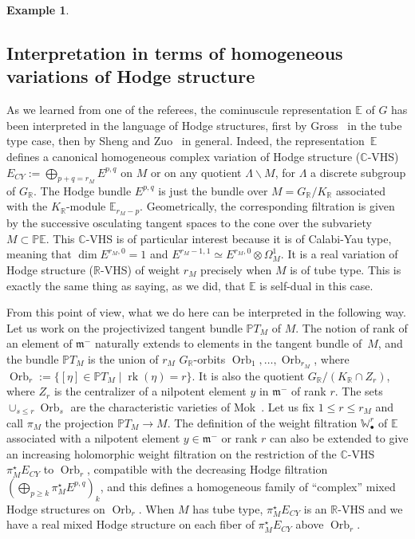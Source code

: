 \documentclass[10pt]{amsart}
\newcommand{\sbullet}{{\scriptscriptstyle\bullet}}
\theoremstyle{plain}
\theoremstyle{definition}
\newtheorem{exem}[theo]{Example}
\let\rgy r
\DeclareMathOperator{\Orb}{Orb}
\DeclareMathOperator{\rk}{rk}
\newcommand{\bC}{\mathbb{C}}
\newcommand{\bE}{\mathbb{E}}
\newcommand{\bP}{\mathbb{P}}
\newcommand{\bR}{\mathbb{R}}
\newcommand{\bPTM}{{\mathbb{P}T_M}}
\newcommand{\Wr}{\mathbb{W}^\rgy}
\newcommand{\fm}{\mathfrak{m}}
\newcommand{\rkm}{{r_M}}
\let\Subsection\subsection\let\Subsubsection\subsubsection
\begin{document}
\begin{exem}
\Subsection{Interpretation in terms of homogeneous variations of Hodge structure}
\label{subsec:hodge}

As we learned from one of the referees, the cominuscule
representation $\bE$ of $G$ has been interpreted in the language of Hodge structures,
first by Gross~\cite{Gross} in the tube type case, then by Sheng and Zuo~\cite{ShengZuo} in
general. Indeed, the representation~$\bE$ defines a canonical homogeneous complex variation of
Hodge structure ($\bC$-VHS) $E_{CY}:=\bigoplus_{p+q=\rkm} E^{p,q}$ on $M$ or on any quotient
$\Lambda\backslash M$, for $\Lambda$ a discrete
subgroup of $G_\bR$. The Hodge bundle $E^{p,q}$ is just the bundle over $M=G_\bR/K_\bR$ associated
with the $K_\bR$-module $\bE_{\rkm-p}$.
Geometrically, the corresponding filtration is given by the successive osculating tangent spaces
to the cone over the subvariety $M \subset \bP
\bE$.
This $\bC$-VHS is of particular interest because it is of
Calabi-Yau type, meaning that $\dim
E^{\rkm,0}=1$ and $E^{\rkm-1,1}\simeq E^{\rkm,0}\otimes \Omega^1_M$. It is a real variation of
Hodge structure ($\bR$-VHS) of weight $\rkm$ precisely when $M$ is of tube type. This is exactly
the same thing as saying, as we did, that $\bE$ is self-dual in this case.

From this point of view, what we do here can be interpreted in the following way. Let us work
on the projectivized tangent bundle $\bPTM$ of $M$. The notion of rank of an element of $\fm^-$
naturally extends to elements in the tangent bundle of~$M$, and the bundle $\bPTM$ is the union
of $\rkm$ $G_\bR$-orbits ${\Orb}_1,\ldots,{\Orb}_\rkm$, where
\hbox{${\Orb}_r:=\{[\eta]\in\bPTM\mid \rk(\eta)=r\}$}. It is also the quotient
$G_\bR/(K_\bR \cap Z_r)$, where $Z_r$ is the centralizer of a nilpotent element $y$ in $\fm^-$ of rank
$r$.
The sets $\cup_{s\leq r}{\Orb}_s$ are the characteristic varieties of
Mok~\cite{Mok}. Let us fix $1\leq r\leq \rkm$ and call $\pi_M$ the projection $\bPTM\to M$.
The definition of the weight filtration $\Wr_\sbullet$ of $\bE$ associated with a nilpotent
element $y\in\fm^-$ or rank $r$ can also be extended to give an increasing holomorphic weight filtration on the
restriction of the $\bC$-VHS $\pi_M^\star E_{CY}$ to $\Orb_r$, compatible with the decreasing
Hodge filtration
$(\bigoplus_{p\geq k}\pi_M^\star E^{p,q})_k$, and this defines a homogeneous family of
``complex'' mixed Hodge structures on ${\Orb}_r$. When $M$ has tube type, $\pi_M^\star E_{CY}$
is an $\bR$-VHS and we have a real mixed Hodge structure on each fiber of $\pi_M^\star
E_{CY}$ above ${\Orb}_r$.


\end{exem}
\end{document}
